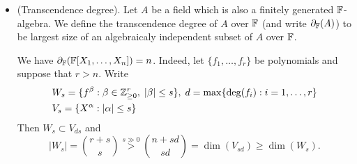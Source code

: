 \begin{itemize}
\begin{example}
    Let $H_f = V(f)$, $f$ irreducible, then 
    \begin{equation}
        \begin{split}
            \dim(H_f) & = \deg\upleft{a}\text{HP}_{I(H_f)}(t)\\
            &=\deg \upleft{a}\text{HP}_{(f)}(t)\\
            &=\deg (\frac{\deg(f)}{(n-1)!}t^{n-1}+\cdots)\\
            &=n-1.
        \end{split}
    \end{equation}
\end{example}
The dimension has the expected property: If $W\subset V$ is closed, then $\dim(W)\leq\dim(V)$. In fact
\begin{equation}
    \begin{split}
        &I(V)\subset I(W)\Rightarrow\\
        &I(V)_{\leq s}\subset I(W)_{\leq s}\Rightarrow \\
        &\upleft{a}\text{HF}_{I(W)}(s) \leq \upleft{a}\text{HF}_{I(V)}(s),\;\forall s\geq0\Rightarrow\\
        &\deg \upleft{a}\text{HF}_{I(W)}(t)\leq \deg \upleft{a}\text{HF}_{I(V)}(t).
    \end{split}
\end{equation}
\item(Transcendence degree). Let $A$ be a field which is also a finitely generated $\mathbb{F}$-algebra. We define 
the transcendence degree of $A$ over $\mathbb{F}$ (and write $\partial_{\mathbb{F}}(A)$) to be largest size of an algebraicaly independent subset of $A$ over 
$\mathbb{F}$. 
\begin{example}
    We have $\partial_{\mathbb{F}}(\mathbb{F}[X_1,\dots, X_n])=n$. Indeed, let $\{f_1,\dots, f_r\}$ be polynomials and
    suppose that $r>n$. 
    Write 
    \begin{equation}
        \begin{split}
            &W_s = \{f^\beta:\beta\in\mathbb{Z}_{\geq0}^r,\;|\beta|\leq s\},\;d=\max\{\deg(f_i):i=1,\dots,r\}\\
            &V_s=\{X^\alpha:|\alpha|\leq s\}
        \end{split}
    \end{equation}
    Then $W_s\subset V_{ds}$ and 
    \begin{equation}
        |W_s| = \binom{r+s}{s} \overset{s\gg0}{>}\binom{n+sd}{sd} = \dim(V_{sd})\geq \dim(W_s).
    \end{equation}

\end{example}
\end{itemize}
